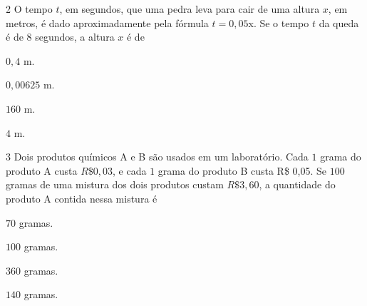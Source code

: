 \num{2}  O tempo $t$, em segundos, que uma pedra leva para cair de uma altura $x$,
em metros, é dado aproximadamente pela fórmula $t = 0,05$x. Se o tempo $t$
da queda é de $8$ segundos, a altura $x$ é de

\begin{escolha}
\item $0,4$ m.
\item $0,00625$ m.
\item $160$ m.
\item $4$ m.
\end{escolha}



\num{3}  Dois produtos químicos A e B são usados em um laboratório. Cada $1$ grama
do produto A custa $R\$ 0,03$, e cada $1$ grama do produto B custa R\$ 0,05.
Se $100$ gramas de uma mistura dos dois produtos custam $R\$ 3,60$, a
quantidade do produto A contida nessa mistura é

\begin{escolha}
\item $70$ gramas.
\item $100$ gramas.
\item $360$ gramas.
\item $140$ gramas.
\end{escolha}


